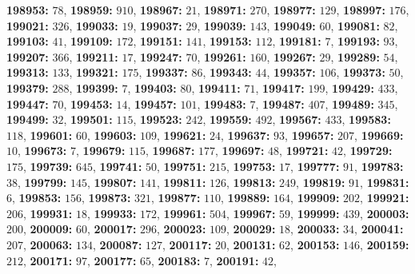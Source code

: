 \textsf{\bfseries 198953:} $78$, \textsf{\bfseries 198959:} $910$, \textsf{\bfseries 198967:} $21$, \textsf{\bfseries 198971:} $270$, \textsf{\bfseries 198977:} $129$, \textsf{\bfseries 198997:} $176$, \textsf{\bfseries 199021:} $326$, \textsf{\bfseries 199033:} $19$, \textsf{\bfseries 199037:} $29$, \textsf{\bfseries 199039:} $143$, \textsf{\bfseries 199049:} $60$, \textsf{\bfseries 199081:} $82$, \textsf{\bfseries 199103:} $41$, \textsf{\bfseries 199109:} $172$, \textsf{\bfseries 199151:} $141$, \textsf{\bfseries 199153:} $112$, \textsf{\bfseries 199181:} $7$, \textsf{\bfseries 199193:} $93$, \textsf{\bfseries 199207:} $366$, \textsf{\bfseries 199211:} $17$, \textsf{\bfseries 199247:} $70$, \textsf{\bfseries 199261:} $160$, \textsf{\bfseries 199267:} $29$, \textsf{\bfseries 199289:} $54$, \textsf{\bfseries 199313:} $133$, \textsf{\bfseries 199321:} $175$, \textsf{\bfseries 199337:} $86$, \textsf{\bfseries 199343:} $44$, \textsf{\bfseries 199357:} $106$, \textsf{\bfseries 199373:} $50$, \textsf{\bfseries 199379:} $288$, \textsf{\bfseries 199399:} $7$, \textsf{\bfseries 199403:} $80$, \textsf{\bfseries 199411:} $71$, \textsf{\bfseries 199417:} $199$, \textsf{\bfseries 199429:} $433$, \textsf{\bfseries 199447:} $70$, \textsf{\bfseries 199453:} $14$, \textsf{\bfseries 199457:} $101$, \textsf{\bfseries 199483:} $7$, \textsf{\bfseries 199487:} $407$, \textsf{\bfseries 199489:} $345$, \textsf{\bfseries 199499:} $32$, \textsf{\bfseries 199501:} $115$, \textsf{\bfseries 199523:} $242$, \textsf{\bfseries 199559:} $492$, \textsf{\bfseries 199567:} $433$, \textsf{\bfseries 199583:} $118$, \textsf{\bfseries 199601:} $60$, \textsf{\bfseries 199603:} $109$, \textsf{\bfseries 199621:} $24$, \textsf{\bfseries 199637:} $93$, \textsf{\bfseries 199657:} $207$, \textsf{\bfseries 199669:} $10$, \textsf{\bfseries 199673:} $7$, \textsf{\bfseries 199679:} $115$, \textsf{\bfseries 199687:} $177$, \textsf{\bfseries 199697:} $48$, \textsf{\bfseries 199721:} $42$, \textsf{\bfseries 199729:} $175$, \textsf{\bfseries 199739:} $645$, \textsf{\bfseries 199741:} $50$, \textsf{\bfseries 199751:} $215$, \textsf{\bfseries 199753:} $17$, \textsf{\bfseries 199777:} $91$, \textsf{\bfseries 199783:} $38$, \textsf{\bfseries 199799:} $145$, \textsf{\bfseries 199807:} $141$, \textsf{\bfseries 199811:} $126$, \textsf{\bfseries 199813:} $249$, \textsf{\bfseries 199819:} $91$, \textsf{\bfseries 199831:} $6$, \textsf{\bfseries 199853:} $156$, \textsf{\bfseries 199873:} $321$, \textsf{\bfseries 199877:} $110$, \textsf{\bfseries 199889:} $164$, \textsf{\bfseries 199909:} $202$, \textsf{\bfseries 199921:} $206$, \textsf{\bfseries 199931:} $18$, \textsf{\bfseries 199933:} $172$, \textsf{\bfseries 199961:} $504$, \textsf{\bfseries 199967:} $59$, \textsf{\bfseries 199999:} $439$, \textsf{\bfseries 200003:} $200$, \textsf{\bfseries 200009:} $60$, \textsf{\bfseries 200017:} $296$, \textsf{\bfseries 200023:} $109$, \textsf{\bfseries 200029:} $18$, \textsf{\bfseries 200033:} $34$, \textsf{\bfseries 200041:} $207$, \textsf{\bfseries 200063:} $134$, \textsf{\bfseries 200087:} $127$, \textsf{\bfseries 200117:} $20$, \textsf{\bfseries 200131:} $62$, \textsf{\bfseries 200153:} $146$, \textsf{\bfseries 200159:} $212$, \textsf{\bfseries 200171:} $97$, \textsf{\bfseries 200177:} $65$, \textsf{\bfseries 200183:} $7$, \textsf{\bfseries 200191:} $42$, 
